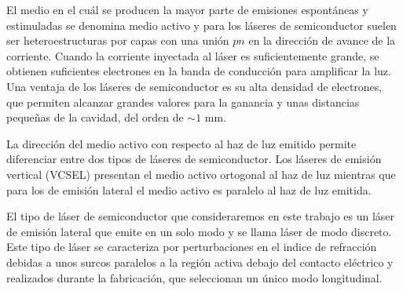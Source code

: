 El medio en el cu\'al se producen la mayor parte de emisiones espont\'aneas y estimuladas se denomina medio activo y para los l\'aseres de semiconductor suelen ser heteroestructuras por capas con una uni\'on $pn$ en la direcci\'on de avance de la corriente. Cuando la corriente inyectada al l\'aser es suficientemente grande, se obtienen suficientes electrones en la banda de conducci\'on para amplificar la luz. Una ventaja de los l\'aseres de semiconductor es su alta densidad de electrones, que permiten alcanzar grandes valores para la ganancia y unas distancias pequeñas de la cavidad, del orden de $\sim 1$ mm.

La direcci\'on del medio activo con respecto al haz de luz emitido permite diferenciar entre dos tipos de l\'aseres de semiconductor. Los l\'aseres de emisi\'on vertical (VCSEL) presentan el medio activo ortogonal al haz de luz mientras que para los de emisión lateral el medio activo es paralelo al haz de luz emitida. 

El tipo de l\'aser de semiconductor que consideraremos en este trabajo es un l\'aser de emisi\'on lateral que emite en un solo modo y se llama l\'aser de modo discreto. Este tipo de l\'aser se caracteriza por perturbaciones en el indice de refracci\'on debidas a unos surcos paralelos a la regi\'on activa debajo del contacto el\'ectrico y realizados durante la fabricaci\'on, que seleccionan un \'unico modo longitudinal.
